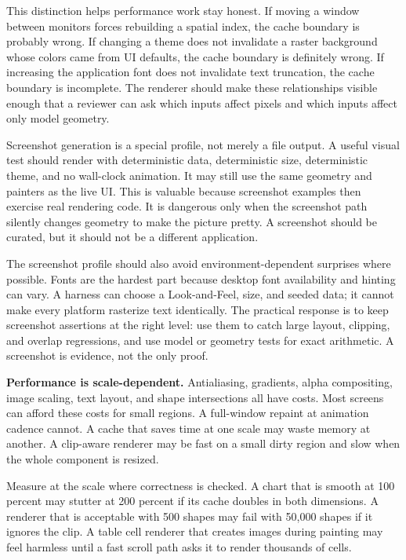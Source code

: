 This distinction helps performance work stay honest. If moving a window between monitors forces rebuilding a spatial index, the cache boundary is probably wrong. If changing a theme does not invalidate a raster background whose colors came from UI defaults, the cache boundary is definitely wrong. If increasing the application font does not invalidate text truncation, the cache boundary is incomplete. The renderer should make these relationships visible enough that a reviewer can ask which inputs affect pixels and which inputs affect only model geometry.

Screenshot generation is a special profile, not merely a file output. A useful visual test should render with deterministic data, deterministic size, deterministic theme, and no wall-clock animation. It may still use the same geometry and painters as the live UI. This is valuable because screenshot examples then exercise real rendering code. It is dangerous only when the screenshot path silently changes geometry to make the picture pretty. A screenshot should be curated, but it should not be a different application.

The screenshot profile should also avoid environment-dependent surprises where possible. Fonts are the hardest part because desktop font availability and hinting can vary. A harness can choose a Look-and-Feel, size, and seeded data; it cannot make every platform rasterize text identically. The practical response is to keep screenshot assertions at the right level: use them to catch large layout, clipping, and overlap regressions, and use model or geometry tests for exact arithmetic. A screenshot is evidence, not the only proof.

\textbf{Performance is scale-dependent.} Antialiasing, gradients, alpha compositing, image scaling, text layout, and shape intersections all have costs. Most screens can afford these costs for small regions. A full-window repaint at animation cadence cannot. A cache that saves time at one scale may waste memory at another. A clip-aware renderer may be fast on a small dirty region and slow when the whole component is resized.

Measure at the scale where correctness is checked. A chart that is smooth at 100 percent may stutter at 200 percent if its cache doubles in both dimensions. A renderer that is acceptable with 500 shapes may fail with 50,000 shapes if it ignores the clip. A table cell renderer that creates images during painting may feel harmless until a fast scroll path asks it to render thousands of cells.

